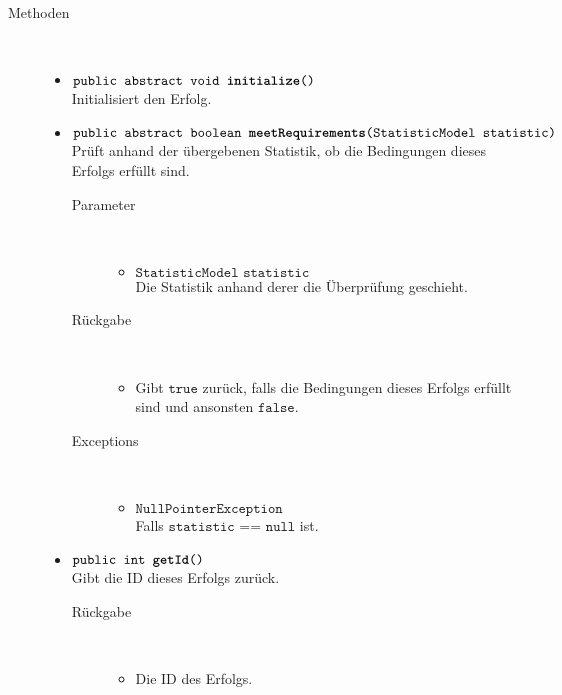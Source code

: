 \begin{description}
		\item[Methoden] \hfill \\
			\vspace{-.8cm}
			\begin{itemize}
				\item $\texttt{public abstract void \textbf{initialize}()}$ \\ Initialisiert den Erfolg.
				
				\item $\texttt{public abstract boolean \textbf{meetRequirements}(StatisticModel statistic)}$ \\ Prüft anhand der übergebenen Statistik, ob die Bedingungen dieses Erfolgs erfüllt sind.
				\begin{description}
				\item[Parameter] \hfill \\
					\vspace{-.8cm}
					\begin{itemize}
						\item $\texttt{StatisticModel statistic}$ \\ Die Statistik anhand derer die Überprüfung geschieht. 
					\end{itemize}
					\item[Rückgabe] \hfill \\
					\vspace{-.8cm}
					\begin{itemize}
						\item Gibt $\texttt{true}$ zurück, falls die Bedingungen dieses Erfolgs erfüllt sind und ansonsten $\texttt{false}$.
					\end{itemize}
					\item[Exceptions] \hfill \\
					\vspace{-.8cm}
					\begin{itemize}
						\item $\texttt{NullPointerException}$ \\ Falls $\texttt{statistic == null}$ ist.
					\end{itemize}
				\end{description}
				
				\item $\texttt{public int \textbf{getId}()}$ \\ Gibt die ID dieses Erfolgs zurück.
				\begin{description}
					\item[Rückgabe] \hfill \\
					\vspace{-.8cm}
					\begin{itemize}
						\item Die ID des Erfolgs.
					\end{itemize}
				\end{description}
		

\end{itemize}
\end{description}

